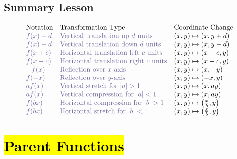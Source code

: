 \documentclass[12pt,a4paper]{article}
\begin{document}
\subsection*{Summary Lesson}

\[
\begin{array}{lll}
\text{Notation} & \text{Transformation Type} & \text{Coordinate Change} \\
\textcolor{CadetBlue}{f(x)+d} & \textcolor{CadetBlue}{\text{Vertical translation up } d \text{ units}} & (x, y) \mapsto(x, y+d) \\
\textcolor{CadetBlue}{f(x)-d} & \textcolor{CadetBlue}{\text{Vertical translation down } d \text{ units}} & (x, y) \mapsto(x, y-d) \\
\textcolor{CadetBlue}{f(x+c)} & \textcolor{CadetBlue}{\text{Horizontal translation left } c \text{ units}} & (x, y) \mapsto(x-c, y) \\
\textcolor{CadetBlue}{f(x-c)} & \textcolor{CadetBlue}{\text{Horizontal translation right } c \text{ units}} & (x, y) \mapsto(x+c, y) \\
\textcolor{CadetBlue}{-f(x)} & \textcolor{CadetBlue}{\text{Reflection over } x \text{-axis}} & (x, y) \mapsto(x,-y) \\
\textcolor{CadetBlue}{f(-x)} & \textcolor{CadetBlue}{\text{Reflection over } y \text{-axis}} & (x, y) \mapsto(-x, y) \\
\textcolor{CadetBlue}{a f(x)} & \textcolor{CadetBlue}{\text{Vertical stretch for } |a|>1} & (x, y) \mapsto(x, a y) \\
\textcolor{CadetBlue}{a f(x)} & \textcolor{CadetBlue}{\text{Vertical compression for } |a|<1} & (x, y) \mapsto(x, a y) \\
\textcolor{CadetBlue}{f(b x)} & \textcolor{CadetBlue}{\text{Horizontal compression for } |b|>1} & (x, y) \mapsto\left(\frac{x}{b}, y\right) \\
\textcolor{CadetBlue}{f(b x)} & \textcolor{CadetBlue}{\text{Horizontal stretch for } |b|<1} & (x, y) \mapsto\left(\frac{x}{b}, y\right)
\end{array}
\]


\newpage
\section*{\hl{Parent Functions}}
\end{document}
